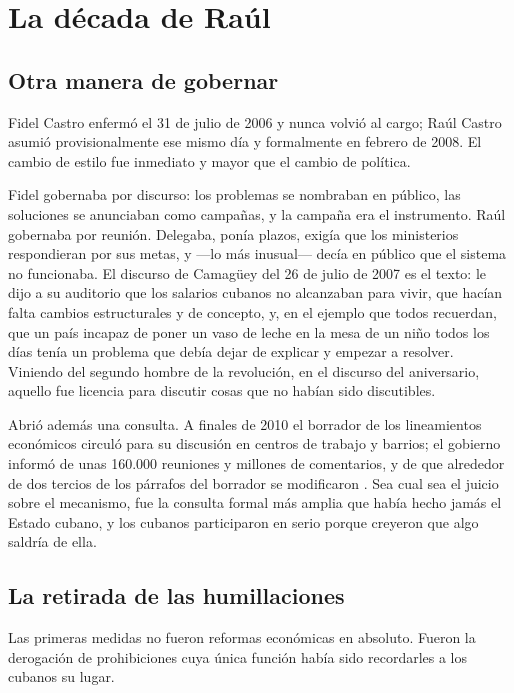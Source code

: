 \chapter{La década de Raúl}
\label{ch:raul}

\section{Otra manera de gobernar}

Fidel Castro enfermó el 31 de julio de 2006 y nunca volvió al cargo; Raúl Castro
asumió provisionalmente ese mismo día y formalmente en febrero de 2008. El cambio
de estilo fue inmediato y mayor que el cambio de política.

Fidel gobernaba por discurso: los problemas se nombraban en público, las
soluciones se anunciaban como campañas, y la campaña era el instrumento. Raúl
gobernaba por reunión. Delegaba, ponía plazos, exigía que los ministerios
respondieran por sus metas, y ---lo más inusual--- decía en público que el sistema
no funcionaba. El discurso de Camagüey del 26 de julio de 2007 es el texto: le
dijo a su auditorio que los salarios cubanos no alcanzaban para vivir, que hacían
falta cambios estructurales y de concepto, y, en el ejemplo que todos recuerdan,
que un país incapaz de poner un vaso de leche en la mesa de un niño todos los días
tenía un problema que debía dejar de explicar y empezar a resolver. Viniendo del
segundo hombre de la revolución, en el discurso del aniversario, aquello fue
licencia para discutir cosas que no habían sido discutibles.

Abrió además una consulta. A finales de 2010 el borrador de los lineamientos
económicos circuló para su discusión en centros de trabajo y barrios; el gobierno
informó de unas 160.000 reuniones y millones de comentarios, y de que alrededor de
dos tercios de los párrafos del borrador se modificaron
\citep{mesalago2013}.\unv{} Sea cual sea el juicio sobre el mecanismo, fue la
consulta formal más amplia que había hecho jamás el Estado cubano, y los cubanos
participaron en serio porque creyeron que algo saldría de ella.

\section{La retirada de las humillaciones}

Las primeras medidas no fueron reformas económicas en absoluto. Fueron la
derogación de prohibiciones cuya única función había sido recordarles a los
cubanos su lugar.

